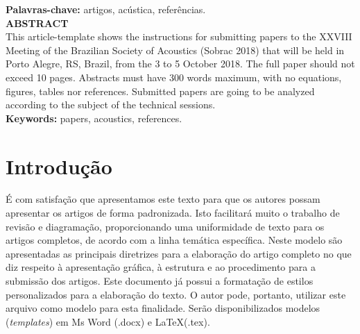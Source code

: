 \documentclass[12pt, a4paper, oneside, onecolumn] {article}%
\begin{document}
%
\textbf{Palavras-chave:}{\fontsize{11}{12}\selectfont 
 artigos, acústica, referências.
}\\[18pt]
\txtEN %
{\fontsize{12}{12} \selectfont \bfseries \uppercase{Abstract}}\\[6pt]
{\fontsize{11}{14.5} \selectfont 
This article-template shows the instructions for submitting papers to the XXVIII Meeting of the Brazilian Society of Acoustics (Sobrac 2018) that will be held in Porto Alegre, RS, Brazil, from the 3 to 5 October 2018. The full paper should not exceed 10 pages. Abstracts must have 300 words maximum, with no equations, figures, tables nor references. Submitted papers are going to be analyzed according to the subject of the technical sessions.
}\\[6pt]
%
\textbf{Keywords:}{\fontsize{11}{12}\selectfont
 papers, acoustics, references.
}\\[2pt]


\section{Introdução}

É com satisfação que apresentamos este texto para que os autores possam apresentar os artigos de forma padronizada. Isto facilitará muito o trabalho de revisão e diagramação, proporcionando uma uniformidade de texto para os artigos completos, de acordo com a linha temática específica. Neste modelo são apresentadas as principais diretrizes para a elaboração do artigo completo no que diz respeito à apresentação gráfica, à estrutura e ao procedimento para a submissão dos artigos. Este documento já possui a formatação de estilos personalizados para a elaboração do texto. O autor pode, portanto, utilizar este arquivo como modelo para esta finalidade. Serão disponibilizados modelos (\textit{templates}) em Ms Word (.docx) e \LaTeX\xspace (.tex).
\end{document}
